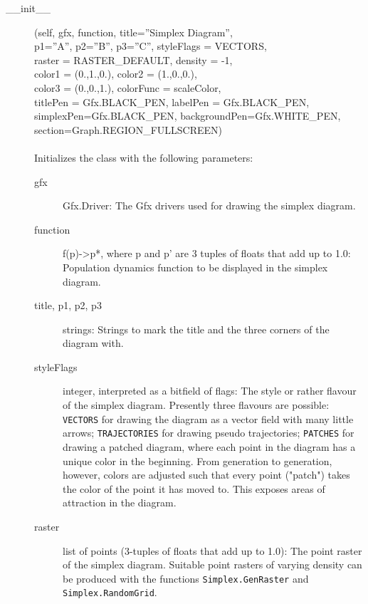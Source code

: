 \documentclass[12pt,a4paper,USenglish]{article}
\begin{document}
\begin{description}

\item[\_\_init\_\_] (self, gfx, function, title=''Simplex Diagram'',\\
                 p1=''A'', p2=''B'', p3=''C'', styleFlags = VECTORS,\\
                 raster = RASTER\_DEFAULT, density = -1,\\
                 color1 = (0.,1.,0.), color2 = (1.,0.,0.),\\
                 color3 = (0.,0.,1.), colorFunc = scaleColor,\\
                 titlePen = Gfx.BLACK\_PEN, labelPen = Gfx.BLACK\_PEN,\\
                 simplexPen=Gfx.BLACK\_PEN, backgroundPen=Gfx.WHITE\_PEN,\\
                 section=Graph.REGION\_FULLSCREEN)\\
\\Initializes the class with the following parameters:

\begin{description}

\item[gfx] Gfx.Driver: The Gfx drivers used for drawing the simplex diagram.

\item[function] f(p)->p*, where p and p' are 3 tuples of floats
        that add up to 1.0: Population dynamics function to be displayed
	in the simplex diagram.

\item[title, p1, p2, p3] strings: Strings to mark the title and the
        three corners of the diagram with.

\item[styleFlags] integer, interpreted as a bitfield of flags:
            The style or rather flavour of the simplex diagram.
            Presently three flavours are possible: {\tt VECTORS} for drawing
            the diagram as a vector field with many little arrows;
            {\tt TRAJECTORIES} for drawing pseudo trajectories; 
	    {\tt PATCHES} for drawing a patched diagram, where each 
	    point in the diagram has a unique color in the beginning. 
            From generation to generation, however, colors are adjusted 
	    such that every point ("patch") takes the color of the point it
            has moved to. This exposes areas of attraction in the
            diagram.

\item[raster] list of points (3-tuples of floats that add up to 1.0):
	The point raster of the simplex diagram. Suitable point rasters of
	varying density can be produced with the functions 
	{\tt Simplex.GenRaster} and {\tt Simplex.RandomGrid}.


\end{description}
\end{description}
\end{document}
